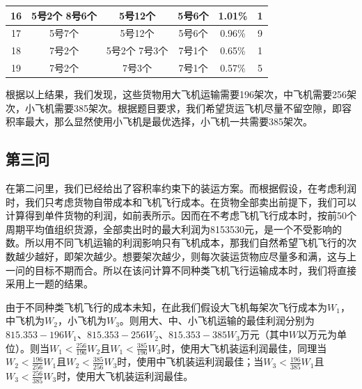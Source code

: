 \documentclass{article}
\begin{document}
\begin{table}[!h]
\begin{tabular}{|c|c|c|c|c|c|}
			16    & 5号2个 8号6个                                                 & 5号12个                                                      & 5号6个                                                            & 1.01\% & 1   \\ \hline
			17    & 5号7个                                                      & 5号12个                                                      & 5号6个                                                            & 0.96\% & 9   \\ \hline
			18    & 7号2个                                                      & 5号2个 7号3个                                                  & 7号1个                                                            & 0.65\% & 1   \\ \hline
			19    & 7号2个                                                      & 7号3个                                                       & 7号1个                                                            & 0.57\% & 5   \\ \hline
		\end{tabular}
	\end{table}

	根据以上结果，我们发现，这些货物用大飞机运输需要196架次，中飞机需要256架次，小飞机需要385架次。根据题目要求，我们希望货运飞机尽量不留空隙，即容积率最大，那么显然使用小飞机是最优选择，小飞机一共需要385架次。
	
	\newpage
	 \subsection{第三问}
	在第二问里，我们已经给出了容积率约束下的装运方案。而根据假设，在考虑利润时，我们只考虑货物自带成本和飞机飞行成本。在货物全部卖出前提下，我们可以计算得到单件货物的利润，如前表所示。因而在不考虑飞机飞行成本时，按前50个周期平均值组织货源，全部卖出时的最大利润为8153530元，是一个不受影响的数。所以用不同飞机运输的利润影响只有飞机成本，那我们自然希望飞机飞行的次数越少越好，即架次越少。想要架次越少，则每次装运货物应尽量多和满，这与上一问的目标不期而合。所以在该问计算不同种类飞机飞行运输成本时，我们将直接采用上一题的结果。
	
	由于不同种类飞机飞行的成本未知，在此我们假设大飞机每架次飞行成本为$W_1$，中飞机为$W_2$，小飞机为$W_3$。则用大、中、小飞机运输的最佳利润分别为$815.353-196W_1$、$815.353-256W_2$、$815.353-385W_3$万元（其中$W$以万元为单位）。则当$W_1<\frac{256}{196}W_2$且$W_1<\frac{385}{196}W_3$时，使用大飞机装运利润最佳，同理当$W_2<\frac{196}{256}W_1$且$W_2<\frac{385}{256}W_3$时，使用中飞机装运利润最佳；当$W_3<\frac{196}{385}W_1$且$W_3<\frac{256}{385}W_3$时，使用大飞机装运利润最佳。
\end{document}
